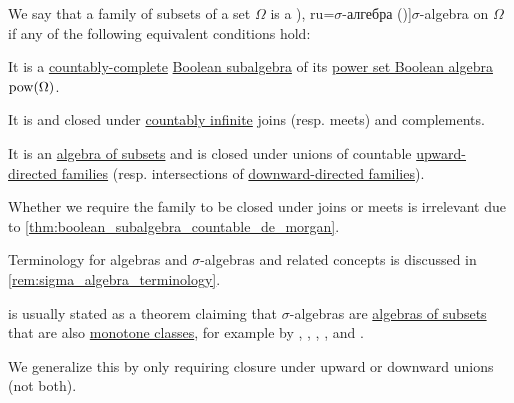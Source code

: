 \begin{definition}\label{def:sigma_algebra}
  We say that a family of subsets of a set \( \Omega \) is a \term[bg=\( \sigma \)-алгебра (\cite[def. 3.3]{Драганов2022ТеорияНаМярката}), ru=\( \sigma \)-алгебра (\cite[def. II.1.4]{Ширяев2007ВероятностьТом1})]{\( \sigma \)-algebra} on \( \Omega \) if any of the following equivalent conditions hold:
  \begin{thmenum}
    \mimprovised It is a \hyperref[def:countably_complete_lattice]{countably-complete} \hyperref[def:boolean_algebra/submodel]{Boolean subalgebra} of its \hyperref[thm:boolean_algebra_of_subsets]{power set Boolean algebra} \( \operatorname{pow}(\Omega) \).

     It is  and closed under \hyperref[def:set_countability/countably_infinite]{countably infinite} joins (resp. meets) and complements.

     It is an \hyperref[def:algebra_of_subsets]{algebra of subsets} and is closed under unions of countable \hyperref[def:directed_set]{upward-directed families} (resp. intersections of \hyperref[def:directed_set]{downward-directed families}).
  \end{thmenum}
\end{definition}
\begin{comments}
  \item Whether we require the family to be closed under joins or meets is irrelevant due to \cref{thm:boolean_subalgebra_countable_de_morgan}.

  \item Terminology for algebras and \( \sigma \)-algebras and related concepts is discussed in \cref{rem:sigma_algebra_terminology}.
  \item {} is usually stated as a theorem claiming that \( \sigma \)-algebras are \hyperref[def:algebra_of_subsets]{algebras of subsets} that are also \hyperref[def:monotone_class]{monotone classes}, for example by
  ,
  ,
  ,
  ,
   and
  .

  We generalize this by only requiring closure under upward or downward unions (not both).
\end{comments}
